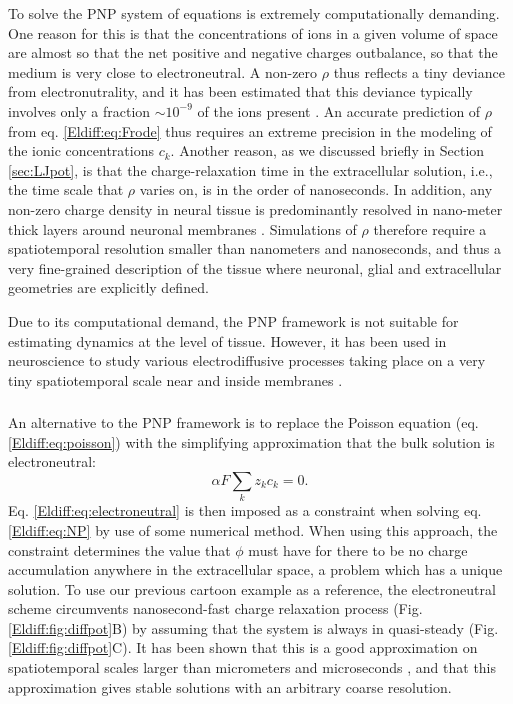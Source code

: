 To solve the PNP system of equations is extremely computationally demanding. One reason for this is that the concentrations of ions in a given volume of space are almost so that the net positive and negative charges outbalance, so that the medium is very close to electroneutral. A non-zero $\rho$ thus reflects a tiny deviance from electronutrality, and it has been estimated that this deviance typically involves only a fraction $\sim 10^{-9}$ of the ions present \cite{Aguilella1986}. An accurate prediction of $\rho$ from eq. \ref{Eldiff:eq:Frode} thus requires an extreme precision in the modeling of the ionic concentrations $c_k$. Another reason, as we discussed briefly in Section \ref{sec:LJpot}, is that the charge-relaxation time in the extracellular solution, i.e., the time scale that $\rho$ varies on, is in the order of nanoseconds. In addition, any non-zero charge density in neural tissue is predominantly resolved in nano-meter thick layers around neuronal membranes \cite{Grodzinsky2011, Gratiy2017}. Simulations of $\rho$ therefore require a spatiotemporal resolution smaller than nanometers and nanoseconds, and thus a very fine-grained description of the tissue where neuronal, glial and extracellular geometries are explicitly defined.

Due to its computational demand, the PNP framework is not suitable for estimating dynamics at the level of tissue. However, it has been used in neuroscience to study various electrodiffusive processes taking place on a very tiny spatiotemporal scale near and inside membranes \cite{Leonetti1998, Leonetti2004, Lu2007, Lopreore2008, Nanninga2008, Pods2013, Gardner2015}. 


\subsubsection{}

An alternative to the PNP framework is to replace the Poisson equation (eq. \ref{Eldiff:eq:poisson}) with the simplifying approximation that the bulk solution is electroneutral:
\begin{equation}
\alpha F \sum_k z_k c_k = 0.
\label{Eldiff:eq:electroneutral}
\end{equation}
Eq. \ref{Eldiff:eq:electroneutral} is then imposed as a constraint when solving eq. \ref{Eldiff:eq:NP} by use of some numerical method. When using this approach, the constraint determines the value that $\phi$ must have for there to be no charge accumulation anywhere in the extracellular space, a problem which has a unique solution. To use our previous cartoon example as a reference, the electroneutral scheme circumvents nanosecond-fast charge relaxation process (Fig. \ref{Eldiff:fig:diffpot}B) by assuming that the system is always in quasi-steady (Fig. \ref{Eldiff:fig:diffpot}C). It has been shown that this is a good approximation on spatiotemporal scales larger than micrometers and microseconds \citep{Grodzinsky2011, Pods2017, Solbra2018}, and that this approximation gives stable solutions with an arbitrary coarse resolution.


